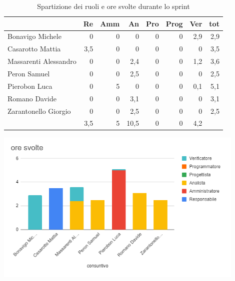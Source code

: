 \begin{table}[ht]
    \begin{tabularx}{\linewidth}{X|rrrrrrr}
    \rowcolor{gray!30}& Re & Amm & An & Pro & Prog & Ver & tot \\
    \hline
    Bonavigo Michele                        & 0 & 0 & 0 & 0 & 0 & 2,9  & 2,9 \\
    \rowcolor{gray!10}Casarotto Mattia      & 3,5 & 0 & 0 & 0 & 0 & 0  & 3,5 \\
    Massarenti Alessandro                   & 0 & 0 & 2,4 & 0 & 0 & 1,2  & 3,6 \\
    \rowcolor{gray!10}Peron Samuel          & 0 & 0 & 2,5 & 0 & 0 & 0 & 2,5 \\
    Pierobon Luca                           & 0 & 5 & 0 & 0 & 0 & 0,1 & 5,1 \\
    \rowcolor{gray!10}Romano Davide         & 0 & 0 & 3,1 & 0 & 0 & 0 & 3,1 \\
    Zarantonello Giorgio                    & 0 & 0 & 2,5 & 0 & 0 & 0 & 2,5 \\
    \hline                                  & 3,5 & 5 & 10,5 & 0 & 0 & 4,2 & 
    \end{tabularx}
    \caption{\label{ruoli-persone}Spartizione dei ruoli e ore svolte durante lo sprint}
\end{table}

\begin{center}
\includegraphics[width=12cm]{img/ore-usate.png}
\end{center}

